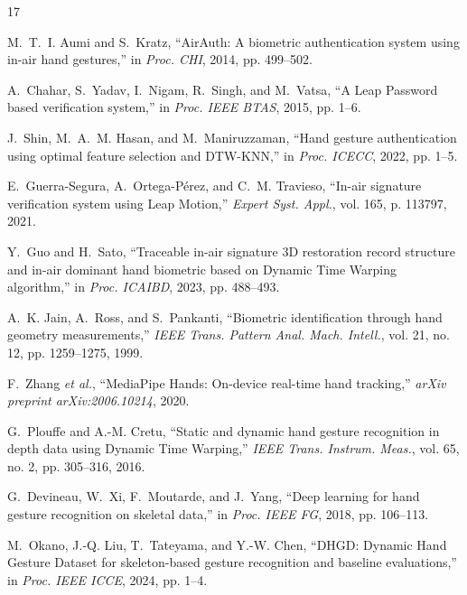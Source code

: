 \documentclass[conference]{IEEEtran}
\begin{document}

\begin{thebibliography}{17}

M.~T.~I. Aumi and S.~Kratz, ``AirAuth: A biometric authentication system using in-air hand gestures,'' in \textit{Proc. CHI}, 2014, pp. 499--502.

A.~Chahar, S.~Yadav, I.~Nigam, R.~Singh, and M.~Vatsa, ``A Leap Password based verification system,'' in \textit{Proc. IEEE BTAS}, 2015, pp. 1--6.

J.~Shin, M.~A.~M. Hasan, and M.~Maniruzzaman, ``Hand gesture authentication using optimal feature selection and DTW-KNN,'' in \textit{Proc. ICECC}, 2022, pp. 1--5.

E.~Guerra-Segura, A.~Ortega-P\'{e}rez, and C.~M. Travieso, ``In-air signature verification system using Leap Motion,'' \textit{Expert Syst. Appl.}, vol. 165, p. 113797, 2021.

Y.~Guo and H.~Sato, ``Traceable in-air signature 3D restoration record structure and in-air dominant hand biometric based on Dynamic Time Warping algorithm,'' in \textit{Proc. ICAIBD}, 2023, pp. 488--493.

A.~K. Jain, A.~Ross, and S.~Pankanti, ``Biometric identification through hand geometry measurements,'' \textit{IEEE Trans. Pattern Anal. Mach. Intell.}, vol. 21, no. 12, pp. 1259--1275, 1999.

F.~Zhang \textit{et al.}, ``MediaPipe Hands: On-device real-time hand tracking,'' \textit{arXiv preprint arXiv:2006.10214}, 2020.

G.~Plouffe and A.-M. Cretu, ``Static and dynamic hand gesture recognition in depth data using Dynamic Time Warping,'' \textit{IEEE Trans. Instrum. Meas.}, vol. 65, no. 2, pp. 305--316, 2016.

G.~Devineau, W.~Xi, F.~Moutarde, and J.~Yang, ``Deep learning for hand gesture recognition on skeletal data,'' in \textit{Proc. IEEE FG}, 2018, pp. 106--113.

M.~Okano, J.-Q. Liu, T.~Tateyama, and Y.-W. Chen, ``DHGD: Dynamic Hand Gesture Dataset for skeleton-based gesture recognition and baseline evaluations,'' in \textit{Proc. IEEE ICCE}, 2024, pp. 1--4.


\end{thebibliography}
\end{document}
